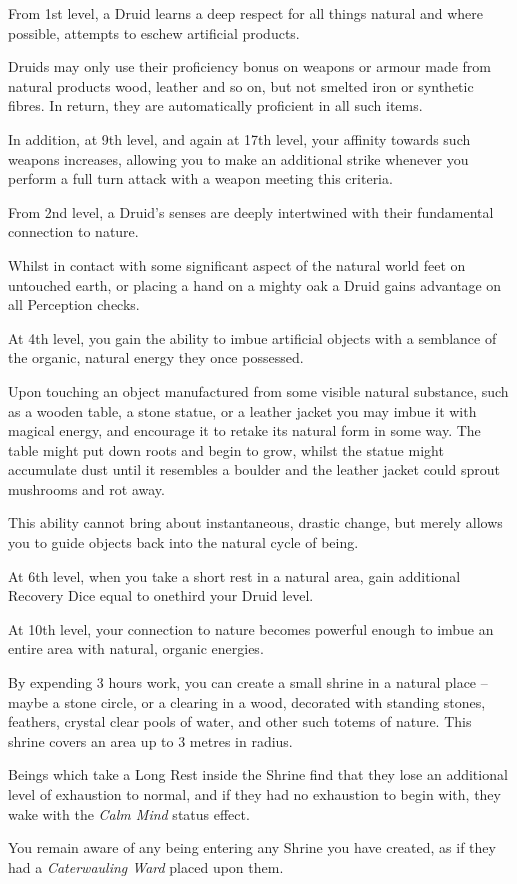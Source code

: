 {
	From 1st level, a Druid learns a deep respect for all things natural \minus{} and where possible, attempts to eschew artificial products. 
	
	Druids may only use their proficiency bonus on weapons or armour made from natural products \minus{} wood, leather and so on, but not smelted iron or synthetic fibres. In return, they are automatically proficient in all such items. 
	
	In addition, at 9th level, and again at 17th level, your affinity towards such weapons increases, allowing you to make an additional strike whenever you perform a full turn attack with a weapon meeting this criteria.
}




{
From 2nd level, a Druid's senses are deeply intertwined with their fundamental connection to nature. 

Whilst in contact with some significant aspect of the natural world \minus{} feet on untouched earth, or placing a hand on a mighty oak \minus{} a Druid gains advantage on all Perception checks. 
}

{
	At 4th level, you gain the ability to imbue artificial objects with a semblance of the organic, natural energy they once possessed. 
	
	Upon touching an object manufactured from some visible natural substance, such as a wooden table, a stone statue, or a leather jacket you may imbue it with magical energy, and encourage it to retake its natural form in some way. The table might put down roots and begin to grow, whilst the statue might accumulate dust until it resembles a boulder and the leather jacket could sprout mushrooms and rot away. 

	This ability cannot bring about instantaneous, drastic change, but merely allows you to guide objects back into the natural cycle of being. 
}

{
	At 6th level, when you take a short rest in a natural area, gain additional Recovery Dice equal to one\minus{}third your Druid level. 
}

{
	At 10th level, your connection to nature becomes powerful enough to imbue an entire area with natural, organic energies.
	
	By expending 3 hours work, you can create a small shrine in a natural place – maybe a stone circle, or a clearing in a wood, decorated with standing stones, feathers, crystal clear pools of water, and other such totems of nature. This shrine covers an area up to 3 metres in radius. 

	Beings which take a Long Rest inside the Shrine find that they lose an additional level of exhaustion to normal, and if they had no exhaustion to begin with, they wake with the {\it Calm Mind} status effect. 
	
	You remain aware of any being entering any Shrine you have created, as if they had a {\it Caterwauling Ward} placed upon them.
}

